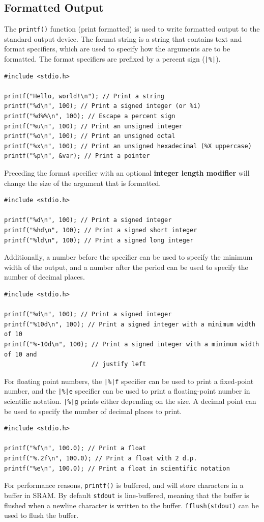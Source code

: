 \documentclass{report}
\begin{document}
\subsection{Formatted Output}
The \texttt{printf()} function (print formatted) is used to write formatted output to the standard output device. The format string is a string that contains
text and format specifiers, which are used to specify how the arguments are to be formatted. The format specifiers are prefixed by a percent sign (\texttt{|\%|}).
\begin{verbatim}
#include <stdio.h>

printf("Hello, world!\n"); // Print a string
printf("%d\n", 100); // Print a signed integer (or %i)
printf("%d%%\n", 100); // Escape a percent sign
printf("%u\n", 100); // Print an unsigned integer
printf("%o\n", 100); // Print an unsigned octal
printf("%x\n", 100); // Print an unsigned hexadecimal (%X uppercase)
printf("%p\n", &var); // Print a pointer
\end{verbatim}
Preceding the format specifier with an optional \textbf{integer length modifier} will change the size of the argument that is formatted.
\begin{verbatim}
#include <stdio.h>

printf("%d\n", 100); // Print a signed integer
printf("%hd\n", 100); // Print a signed short integer
printf("%ld\n", 100); // Print a signed long integer
\end{verbatim}
Additionally, a number before the specifier can be used to specify the minimum width of the output, and a number after the period can be used to specify the number of decimal places.
\begin{verbatim}
#include <stdio.h>

printf("%d\n", 100); // Print a signed integer
printf("%10d\n", 100); // Print a signed integer with a minimum width of 10
printf("%-10d\n", 100); // Print a signed integer with a minimum width of 10 and
                        // justify left
\end{verbatim}
For floating point numbers, the \texttt{|\%|f} specifier can be used to print a fixed-point number, and the \texttt{|\%|e} specifier can be used to print a floating-point number in scientific notation.
\texttt{|\%|g} prints either depending on the size.
A decimal point can be used to specify the number of decimal places to print.
\begin{verbatim}
#include <stdio.h>

printf("%f\n", 100.0); // Print a float
printf("%.2f\n", 100.0); // Print a float with 2 d.p.
printf("%e\n", 100.0); // Print a float in scientific notation
\end{verbatim}
For performance reasons, \texttt{printf()} is buffered, and will store characters in a buffer in SRAM\@. By default \texttt{stdout}
is line-buffered, meaning that the buffer is flushed when a newline character is written to the buffer. \texttt{fflush(stdout)} can be used to flush the buffer.
\end{document}
